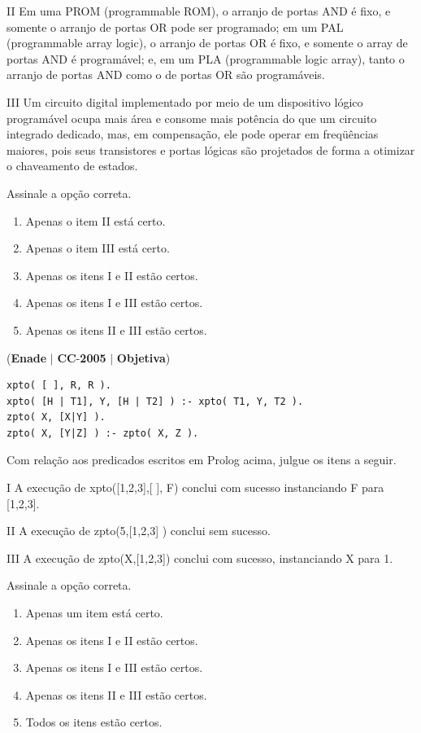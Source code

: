 \documentclass{exam}
\begin{document}
\begin{questions}
II Em uma PROM (programmable ROM), o arranjo de portas AND
é fixo, e somente o arranjo de portas OR pode ser programado; em
um PAL (programmable array logic), o arranjo de portas OR é
fixo, e somente o array de portas AND é programável; e, em um
PLA (programmable logic array), tanto o arranjo de portas AND
como o de portas OR são programáveis.

III Um circuito digital implementado por meio de um dispositivo
lógico programável ocupa mais área e consome mais potência do
que um circuito integrado dedicado, mas, em compensação, ele
pode operar em freqüências maiores, pois seus transistores e
portas lógicas são projetados de forma a otimizar o chaveamento
de estados.

Assinale a opção correta.
	\begin{enumerate}[label=\alph*)]
		\item  Apenas o item II está certo.
		\item  Apenas o item III está certo.
		\item  Apenas os itens I e II estão certos.
		\item  Apenas os itens I e III estão certos.
		\item  Apenas os itens II e III estão certos.
	\end{enumerate}

\question (\textbf{Enade} $|$ \textbf{CC}-\textbf{2005} $|$ \textbf{Objetiva})
\begin{verbatim}
xpto( [ ], R, R ).
xpto( [H | T1], Y, [H | T2] ) :- xpto( T1, Y, T2 ).
zpto( X, [X|Y] ).
zpto( X, [Y|Z] ) :- zpto( X, Z ).
\end{verbatim} 
Com relação aos predicados escritos em Prolog acima, julgue os
itens a seguir.

I A execução de xpto([1,2,3],[ ], F) conclui com sucesso
instanciando F para [1,2,3].

II A execução de zpto(5,[1,2,3] ) conclui sem sucesso.

III A execução de zpto(X,[1,2,3]) conclui com sucesso,
instanciando X para 1.

Assinale a opção correta.
	\begin{enumerate}[label=\alph*)]
		\item  Apenas um item está certo.
		\item  Apenas os itens I e II estão certos.
		\item  Apenas os itens I e III estão certos.
		\item  Apenas os itens II e III estão certos.
		\item  Todos os itens estão certos.
	\end{enumerate}


\end{questions}
\end{document}
